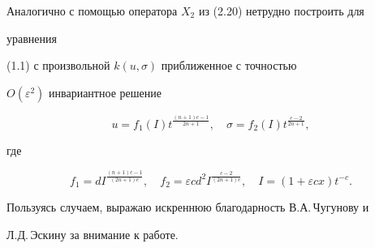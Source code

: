 Аналогично с помощью оператора $X_2$ из (2.20) нетрудно построить для


уравнения


(1.1) с произвольной $k(u,\sigma)$ приближенное с точностью


$O(\varepsilon^2)$ инвариантное решение


$$


u=f_1(I)t^{\frac{(n+1)c-1}{2n+1}},\quad


\sigma=f_2(I)t^{\frac{c-2}{2n+1}},


$$


где


$$


f_1=dI^{\frac{(n+1)c-1}{(2n+1)c}},\quad


f_2=\varepsilon cd^2I^{\frac{c-2}{(2n+1)c}},\quad


I=(1+\varepsilon cx)t^{-c}.


$$





Пользуясь случаем, выражаю искреннюю благодарность В.А.\,Чугунову и


Л.Д.\,Эскину за внимание к работе.









